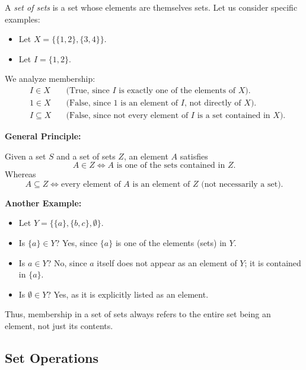 \documentclass[11pt]{article}
\begin{document}
    A \emph{set of sets} is a set whose elements are themselves sets.
    Let us consider specific examples:

    \begin{itemize}
        \item Let $X = \{\{1,2\}, \{3,4\}\}$.
        \item Let $I = \{1,2\}$.
    \end{itemize}

    We analyze membership:
    \begin{align*}
        &I \in X \quad &\text{(True, since $I$ is exactly one of the elements of $X$)}. \\
        &1 \in X \quad &\text{(False, since $1$ is an element of $I$, not directly of $X$)}. \\
        &I \subseteq X \quad &\text{(False, since not every element of $I$ is a set contained in $X$)}.
    \end{align*}

    \textbf{General Principle:}

    Given a set $S$ and a set of sets $Z$, an element $A$ satisfies
    \[
    A \in Z \iff A \text{ is one of the sets contained in } Z.
    \]
    Whereas
    \[
    A \subseteq Z \iff \text{every element of } A \text{ is an element of } Z \text{ (not necessarily a set)}.
    \]

    \textbf{Another Example:}

    \begin{itemize}
        \item Let $Y = \{ \{a\}, \{b, c\}, \emptyset \}$.
        \item Is $\{a\} \in Y$? \hspace{1cm} Yes, since $\{a\}$ is one of the elements (sets) in $Y$.
        \item Is $a \in Y$? \hspace{1.7cm} No, since $a$ itself does not appear as an element of $Y$; it is contained in $\{a\}$.
        \item Is $\emptyset \in Y$? \hspace{1.3cm} Yes, as it is explicitly listed as an element.
    \end{itemize}

    Thus, membership in a set of sets always refers to the entire set being an element, not just its contents.

    \subsection{Set Operations}
    \label{subsec:set-operations}
\end{document}
